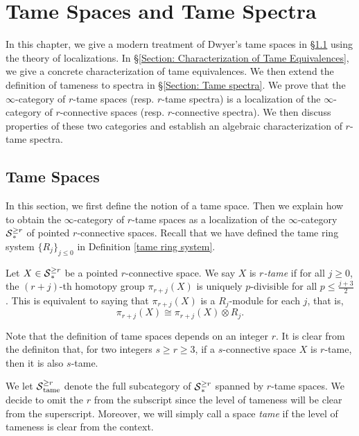 \chapter{Tame Spaces and Tame Spectra}
In this chapter, we give a modern treatment of Dwyer's tame spaces in \S \ref{Section Tame spaces} using the theory of localizations.
In \S \ref{Section: Characterization of Tame Equivalences}, we give a concrete characterization of tame equivalences.
We then extend the definition of tameness to spectra in \S \ref{Section: Tame spectra}.
We prove that the $\infty$-category of $r$-tame spaces (resp. $r$-tame spectra) is a localization of the $\infty$-category of $r$-connective spaces (resp. $r$-connective spectra).
We then discuss properties of these two categories and establish an algebraic characterization of $r$-tame spectra.

\section{Tame Spaces}
\label{Section Tame spaces}
In this section, we first define the notion of a tame space.
Then we explain how to obtain the $\infty$-category of $r$-tame spaces as a localization of the $\infty$-category $\operatorname{\mathcal{S}}_{*}^{\geq r}$ of pointed $r$-connective spaces.
Recall that we have defined the tame ring system $\{R_{j}\}_{j \leq 0}$ in Definition \ref{tame ring system}.

\begin{definition}
	\label{Tame spaces}
	Let $X\in \operatorname{\mathcal{S}}_{*}^{\geq r}$ be a pointed $r$-connective space.
	We say $X$ is \emph{$r$-tame} if for all $j\geq 0$, the $(r+j)$-th homotopy group $\pi_{r+j}(X)$ is uniquely $p$-divisible for all $p\leq \frac{j+3}{2}$. 
	This is equivalent to saying that $\pi_{r+j}(X)$ is a $R_j$-module for each $j$, that is,
	\[
	\pi_{r+j}(X)\cong \pi_{r+j}(X)\otimes R_{j}.
	\]
\end{definition}

    \begin{remark}
        Note that the definition of tame spaces depends on an integer $r$.
        It is clear from the definiton that,
        for two integers $s\geq r \geq 3$, if a $s$-connective space $X$ is $r$-tame, then it is also $s$-tame. 
    \end{remark}
    
    \begin{notation}
        We let $\operatorname{\mathcal{S}}^{\geq r}_{\operatorname{\operatorname{tame}}}$ denote the full subcategory of $\operatorname{\mathcal{S}}^{\geq r}_{*}$ spanned by $r$-tame spaces.
       We decide to omit the $r$ from the subscript since the level of tameness will be clear from the superscript.
       Moreover, we will simply call a space \emph{tame} if the level of tameness is clear from the context.
    \end{notation}
    


